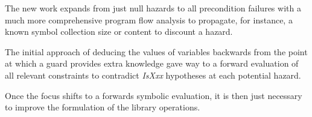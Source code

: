 \documentclass[
]{ceurart}
\begin{document}
The new work expands from just null hazards to all precondition failures with a much more comprehensive program flow analysis to propagate, for instance, a known symbol collection size or content to discount a hazard.

The initial approach of deducing the values of variables backwards from the point at which a guard provides extra knowledge gave way to a forward evaluation of all relevant constraints to contradict \emph{IsXxx} hypotheses at each potential hazard.

Once the focus shifts to a forwards symbolic evaluation, it is then just necessary to improve the formulation of the library operations.








\end{document}
